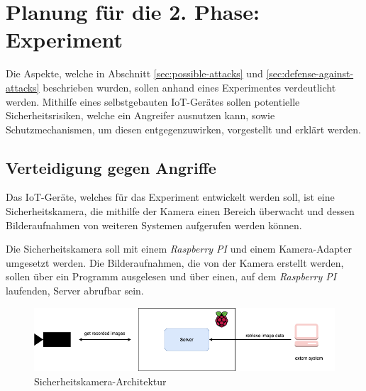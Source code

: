 \section{Planung für die 2. Phase: Experiment}
Die Aspekte, welche in Abschnitt \ref{sec:possible-attacks} und
\ref{sec:defense-against-attacks} beschrieben wurden, sollen anhand eines
Experimentes verdeutlicht werden. Mithilfe eines selbstgebauten IoT-Gerätes
sollen potentielle Sicherheitsrisiken, welche ein Angreifer ausnutzen kann, sowie
Schutzmechanismen, um diesen entgegenzuwirken, vorgestellt und erklärt werden.

\subsection{Verteidigung gegen Angriffe}
Das IoT-Geräte, welches für das Experiment entwickelt werden soll, ist eine
Sicherheitskamera, die mithilfe der Kamera einen Bereich überwacht und dessen
Bilderaufnahmen von  weiteren Systemen aufgerufen werden können.

Die Sicherheitskamera soll mit einem \textit{Raspberry PI} und einem
Kamera-Adapter umgesetzt werden.  Die Bilderaufnahmen, die von der Kamera
erstellt werden, sollen über ein Programm ausgelesen und über einen, auf dem
\textit{Raspberry PI} laufenden, Server abrufbar sein.

\begin{figure}[h]
  \centering
  \includegraphics[width=145mm]{images/raspberrypi.png}
  \caption{Sicherheitskamera-Architektur}
  \label{fig:arch-raspberrypi}
\end{figure}
